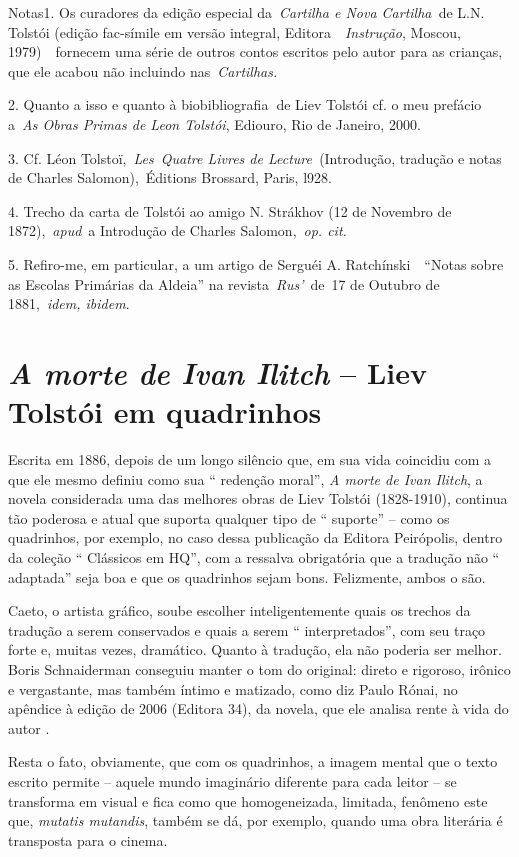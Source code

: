 Notas1. Os curadores da edição especial da~\emph{Cartilha e Nova
Cartilha~}de L.N. Tolstói (edição fac-símile em versão integral,
Editora~~\emph{Instrução}, Moscou, 1979)~~fornecem uma série de outros
contos escritos pelo autor para as crianças, que ele acabou não
incluindo nas~\emph{Cartilhas.}

2. Quanto a isso e quanto à biobibliografia\textbf{~}de Liev Tolstói cf.
o meu prefácio a~\emph{As Obras Primas de Leon Tolstói}, Ediouro, Rio de
Janeiro, 2000.~

3. Cf. Léon Tolstoï,~\emph{Les}~\emph{Quatre Livres de
Lecture~}(Introdução, tradução e notas de Charles Salomon),~Éditions
Brossard, Paris, l928.

4. Trecho da carta de Tolstói ao amigo N. Strákhov (12 de Novembro de
1872),~\emph{apud}~a Introdução de Charles Salomon,~\emph{op. cit.}

5. Refiro-me, em particular, a um artigo de Serguéi A.
Ratchínski~~``Notas sobre as Escolas Primárias da Aldeia'' na
revista~\emph{Rus'}~de~17 de Outubro de 1881,~\emph{idem, ibidem}.

\chapter{\emph{A morte de Ivan Ilitch} -- Liev Tolstói em quadrinhos}

Escrita em 1886, depois de um longo silêncio que, em sua vida coincidiu
com a que ele mesmo definiu como sua `` redenção moral'', \emph{A morte
de Ivan Ilitch}, a novela considerada uma das melhores obras de Liev
Tolstói (1828-1910), continua tão poderosa e atual que suporta qualquer
tipo de `` suporte'' -- como os quadrinhos, por exemplo, no caso dessa
publicação da Editora Peirópolis, dentro da coleção `` Clássicos em
HQ'', com a ressalva obrigatória que a tradução não `` adaptada'' seja
boa e que os quadrinhos sejam bons. Felizmente, ambos o são.

Caeto, o artista gráfico, soube escolher inteligentemente quais os
trechos da tradução a serem conservados e quais a serem ``
interpretados'', com seu traço forte e, muitas vezes, dramático. Quanto
à tradução, ela não poderia ser melhor. Boris Schnaiderman conseguiu
manter o tom do original: direto e rigoroso, irônico e vergastante, mas
também íntimo e matizado, como diz Paulo Rónai, no apêndice à edição de
2006 (Editora 34), da novela, que ele analisa rente à vida do autor .

Resta o fato, obviamente, que com os quadrinhos, a imagem mental que o
texto escrito permite -- aquele mundo imaginário diferente para cada
leitor -- se transforma em visual e fica como que homogeneizada,
limitada, fenômeno este que, \emph{mutatis mutandis}, também se dá, por
exemplo, quando uma obra literária é transposta para o cinema.

